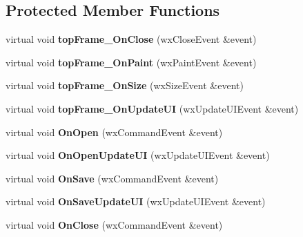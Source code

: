\subsection*{Protected Member Functions}
\begin{DoxyCompactItemize}
\item 
\hypertarget{class_top_frame_aa5f73113b1457581e250a3c5fb8f0064}{virtual void {\bfseries top\-Frame\-\_\-\-On\-Close} (wx\-Close\-Event \&event)}\label{class_top_frame_aa5f73113b1457581e250a3c5fb8f0064}

\item 
\hypertarget{class_top_frame_a68d78b4baf77908eeccd2e6032b75f1b}{virtual void {\bfseries top\-Frame\-\_\-\-On\-Paint} (wx\-Paint\-Event \&event)}\label{class_top_frame_a68d78b4baf77908eeccd2e6032b75f1b}

\item 
\hypertarget{class_top_frame_a834d6181bfec63909019441880f665a7}{virtual void {\bfseries top\-Frame\-\_\-\-On\-Size} (wx\-Size\-Event \&event)}\label{class_top_frame_a834d6181bfec63909019441880f665a7}

\item 
\hypertarget{class_top_frame_ab41da1d8b60a477e0c2b8aa7ce584a54}{virtual void {\bfseries top\-Frame\-\_\-\-On\-Update\-U\-I} (wx\-Update\-U\-I\-Event \&event)}\label{class_top_frame_ab41da1d8b60a477e0c2b8aa7ce584a54}

\item 
\hypertarget{class_top_frame_afbbfabd076b41bcab884206b6c6b0526}{virtual void {\bfseries On\-Open} (wx\-Command\-Event \&event)}\label{class_top_frame_afbbfabd076b41bcab884206b6c6b0526}

\item 
\hypertarget{class_top_frame_a47e0020ef6fc50864c3ac66556ca1185}{virtual void {\bfseries On\-Open\-Update\-U\-I} (wx\-Update\-U\-I\-Event \&event)}\label{class_top_frame_a47e0020ef6fc50864c3ac66556ca1185}

\item 
\hypertarget{class_top_frame_a0171f3cd74c08fdd1c58e2d9448094ea}{virtual void {\bfseries On\-Save} (wx\-Command\-Event \&event)}\label{class_top_frame_a0171f3cd74c08fdd1c58e2d9448094ea}

\item 
\hypertarget{class_top_frame_a617c3d12f8fd373c84858c4d2f0cef34}{virtual void {\bfseries On\-Save\-Update\-U\-I} (wx\-Update\-U\-I\-Event \&event)}\label{class_top_frame_a617c3d12f8fd373c84858c4d2f0cef34}

\item 
\hypertarget{class_top_frame_a62e531b947f11cd089a675807ff12269}{virtual void {\bfseries On\-Close} (wx\-Command\-Event \&event)}\label{class_top_frame_a62e531b947f11cd089a675807ff12269}


\end{DoxyCompactItemize}
